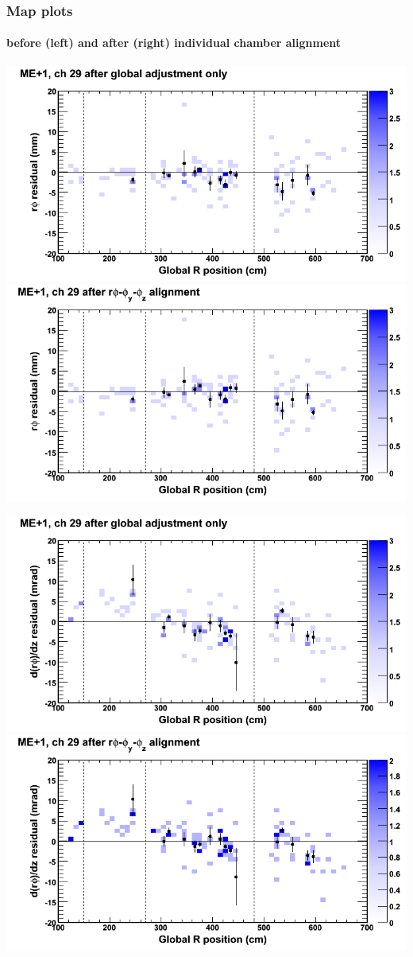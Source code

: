 \documentclass[compress]{beamer}
\begin{document}
\begin{frame}
\frametitle{Map plots}
\framesubtitle{before (left) and after (right) individual chamber alignment}
\includegraphics[width=0.5\linewidth]{ringmapplots_3dof/before_CSCvsr_mep1ch29_x.png} \includegraphics[width=0.5\linewidth]{ringmapplots_3dof/after_CSCvsr_mep1ch29_x.png}

\includegraphics[width=0.5\linewidth]{ringmapplots_3dof/before_CSCvsr_mep1ch29_dxdz.png} \includegraphics[width=0.5\linewidth]{ringmapplots_3dof/after_CSCvsr_mep1ch29_dxdz.png}
\end{frame}
\end{document}
